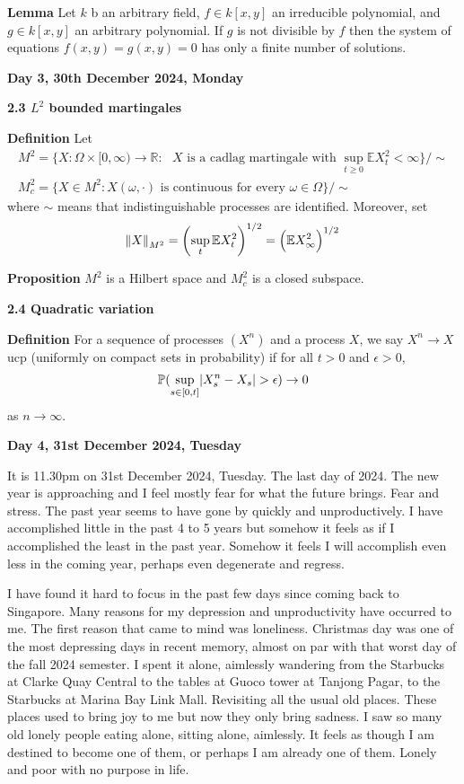 \documentclass[hidelinks, 12pt]{article}
\theoremstyle{mydefstyle}
\theoremstyle{mythmstyle}
\begin{document}
\textbf{Lemma} Let $k$ b an arbitrary field, $f \in k[x, y]$ an irreducible polynomial, and $g \in k[x, y]$ an arbitrary polynomial. If $g$ is not divisible by $f$ then the system of equations $f(x, y) = g(x, y) = 0$ has only a finite number of solutions. 

\textbf{Day 3, 30th December 2024, Monday}

\textbf{2.3 $L^2$ bounded martingales}

\textbf{Definition} Let
\begin{gather*}
M^2 = \{ X : \Omega \times [0, \infty) \to \mathbb{R} : \mbox{ $X$ is a cadlag martingale with $\sup_{t\ge 0} \mathbb{E}X_t^2 < \infty$} \} / \sim \\
M^2_c = \{ X \in M^2 : X(\omega, \cdot) \mbox{ is continuous for every $\omega \in \Omega$} \} / \sim
\end{gather*}
where $\sim$ means that indistinguishable processes are identified. Moreover, set
\begin{gather*}
\norm{X}_{M^2} = \left( \sup_t \mathbb{E}X_t^2 \right)^{1/2} = \left( \mathbb{E} X_{\infty}^2 \right)^{1/2}
\end{gather*}

\textbf{Proposition} $M^2$ is a Hilbert space and $M^2_c$ is a closed subspace.

\textbf{2.4 Quadratic variation}

\textbf{Definition} For a sequence of processes $(X^n)$ and a process $X$, we say $X^n \to X$ ucp (uniformly on compact sets in probability) if for all $t > 0$ and $\epsilon > 0$, 
\begin{gather*}
\mathbb{P}(\sup_{s \in [0, t]} \abs{X^n_s - X_s} > \epsilon) \to 0
\end{gather*}
as $n \to \infty$.

\newpage

\textbf{Day 4, 31st December 2024, Tuesday}

It is 11.30pm on 31st December 2024, Tuesday. The last day of 2024. The new year is approaching and I feel mostly fear for what the future brings. Fear and stress. The past year seems to have gone by quickly and unproductively. I have accomplished little in the past 4 to 5 years but somehow it feels as if I accomplished the least in the past year. Somehow it feels I will accomplish even less in the coming year, perhaps even degenerate and regress.

I have found it hard to focus in the past few days since coming back to Singapore. Many reasons for my depression and unproductivity have occurred to me. The first reason that came to mind was loneliness. Christmas day was one of the most depressing days in recent memory, almost on par with that worst day of the fall 2024 semester. I spent it alone, aimlessly wandering from the Starbucks at Clarke Quay Central to the tables at Guoco tower at Tanjong Pagar, to the Starbucks at Marina Bay Link Mall. Revisiting all the usual old places. These places used to bring joy to me but now they only bring sadness. I saw so many old lonely people eating alone, sitting alone, aimlessly. It feels as though I am destined to become one of them, or perhaps I am already one of them. Lonely and poor with no purpose in life. 
\end{document}
